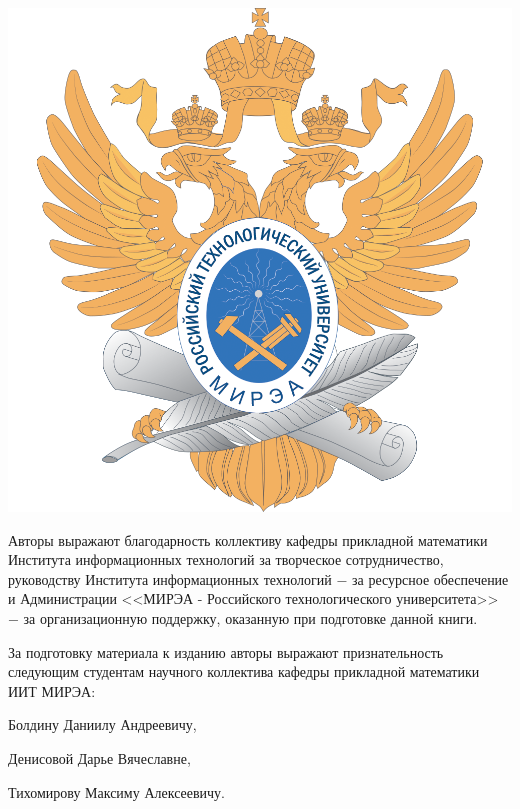 

{\centering \includegraphics[width=0.2\linewidth]{MIREA_logo.png}

}

	
Авторы выражают благодарность коллективу кафедры прикладной математики Института информационных технологий за творческое сотрудничество, руководству Института информационных технологий $-$ за ресурсное обеспечение и Администрации <<МИРЭА - Российского технологического университета>> $-$ за организационную поддержку, оказанную при подготовке данной книги.

За подготовку материала к изданию авторы выражают признательность следующим  студентам научного коллектива кафедры прикладной математики ИИТ МИРЭА:

{\centering Болдину Даниилу Андреевичу,

Денисовой Дарье Вячеславне,

Тихомирову Максиму Алексеевичу.

}